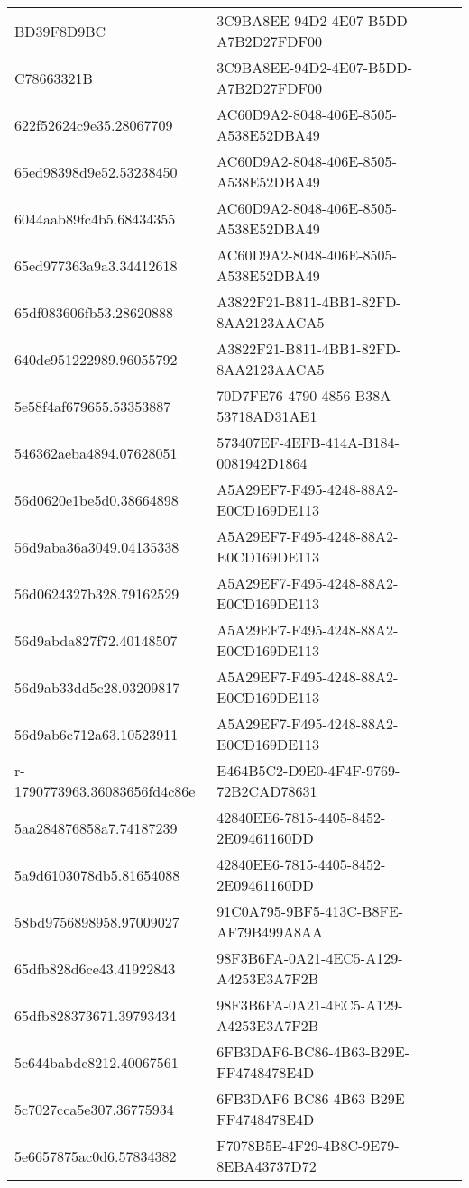\begin{tabular}{ll}
BD39F8D9BC & 3C9BA8EE-94D2-4E07-B5DD-A7B2D27FDF00 \\
C78663321B & 3C9BA8EE-94D2-4E07-B5DD-A7B2D27FDF00 \\
622f52624c9e35.28067709 & AC60D9A2-8048-406E-8505-A538E52DBA49 \\
65ed98398d9e52.53238450 & AC60D9A2-8048-406E-8505-A538E52DBA49 \\
6044aab89fc4b5.68434355 & AC60D9A2-8048-406E-8505-A538E52DBA49 \\
65ed977363a9a3.34412618 & AC60D9A2-8048-406E-8505-A538E52DBA49 \\
65df083606fb53.28620888 & A3822F21-B811-4BB1-82FD-8AA2123AACA5 \\
640de951222989.96055792 & A3822F21-B811-4BB1-82FD-8AA2123AACA5 \\
5e58f4af679655.53353887 & 70D7FE76-4790-4856-B38A-53718AD31AE1 \\
546362aeba4894.07628051 & 573407EF-4EFB-414A-B184-0081942D1864 \\
56d0620e1be5d0.38664898 & A5A29EF7-F495-4248-88A2-E0CD169DE113 \\
56d9aba36a3049.04135338 & A5A29EF7-F495-4248-88A2-E0CD169DE113 \\
56d0624327b328.79162529 & A5A29EF7-F495-4248-88A2-E0CD169DE113 \\
56d9abda827f72.40148507 & A5A29EF7-F495-4248-88A2-E0CD169DE113 \\
56d9ab33dd5c28.03209817 & A5A29EF7-F495-4248-88A2-E0CD169DE113 \\
56d9ab6c712a63.10523911 & A5A29EF7-F495-4248-88A2-E0CD169DE113 \\
r-1790773963.36083656fd4c86e & E464B5C2-D9E0-4F4F-9769-72B2CAD78631 \\
5aa284876858a7.74187239 & 42840EE6-7815-4405-8452-2E09461160DD \\
5a9d6103078db5.81654088 & 42840EE6-7815-4405-8452-2E09461160DD \\
58bd9756898958.97009027 & 91C0A795-9BF5-413C-B8FE-AF79B499A8AA \\
65dfb828d6ce43.41922843 & 98F3B6FA-0A21-4EC5-A129-A4253E3A7F2B \\
65dfb828373671.39793434 & 98F3B6FA-0A21-4EC5-A129-A4253E3A7F2B \\
5c644babdc8212.40067561 & 6FB3DAF6-BC86-4B63-B29E-FF4748478E4D \\
5c7027cca5e307.36775934 & 6FB3DAF6-BC86-4B63-B29E-FF4748478E4D \\
5e6657875ac0d6.57834382 & F7078B5E-4F29-4B8C-9E79-8EBA43737D72 \\

\end{tabular}

